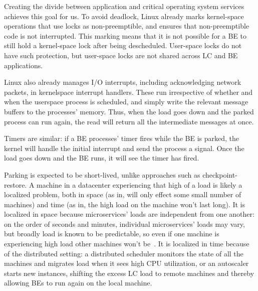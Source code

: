 Creating the divide between application and critical operating system services
achieves this goal for us. To avoid deadlock, Linux already marks kernel-space
operations that use locks as non-preemptible, and ensures that non-preemptible
code is not interrupted. This marking means that it is not possible for a BE to
still hold a kernel-space lock after being descheduled. User-space locks do not
have such protection, but user-space locks are not shared across LC and BE
applications.

Linux also already manages I/O interrupts, including acknowledging network
packets, in kernelspace interrupt handlers. These run irrespective of whether
and when the userspace process is scheduled, and simply write the relevant
message buffers to the processes' memory. Thus, when the load goes down and the
parked process can run again, the read will return all the intermediate messages
at once. 

Timers are similar: if a BE processes' timer fires while the BE is parked, the
kernel will handle the initial interrupt and send the process a signal. Once the
load goes down and the BE runs, it will see the timer has fired.

Parking is expected to be short-lived, unlike approaches such as
checkpoint-restore. A machine in a datacenter experiencing that high of a load
is likely a localized problem, both in space (as in, will only effect some small
number of machines) and time (as in, the high load on the machine won't last
long). It is localized in space because microservices' loads are independent
from one another: on the order of seconds and minutes, individual microservices'
loads may vary, but broadly load is known to be predictable, so even if one
machine is experiencing high load other machines won't be~\cite{TODO}. It is
localized in time because of the distributed setting: a distributed scheduler
monitors the state of all the machines and migrates load when it sees high CPU
utilization, or an autoscaler starts new instances, shifting the excess LC load
to remote machines and thereby allowing BEs to run again on the local machine.